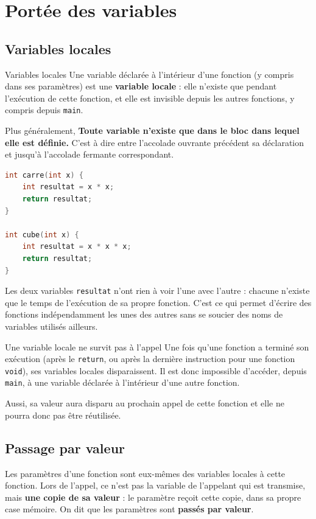 \section{Portée des variables}
\subsection{Variables locales}

\begin{UPSTIinfor}{Variables locales}
  Une variable déclarée à l'intérieur d'une fonction (y compris dans ses paramètres) est une \textbf{variable locale} : elle n'existe que pendant l'exécution de cette fonction, et elle est invisible depuis les autres fonctions, y compris depuis \texttt{main}.

  Plus généralement, \textbf{Toute variable n'existe que dans le bloc dans lequel elle est définie.} 
  C'est à dire entre l'accolade ouvrante précédent sa déclaration et jusqu'à l'accolade fermante correspondant. 
\end{UPSTIinfor}

\begin{lstlisting}[language=c,caption={Deux variables locales du même nom, sans conflit}]
int carre(int x) {
    int resultat = x * x;
    return resultat;
}

int cube(int x) {
    int resultat = x * x * x;
    return resultat;
}
\end{lstlisting}

Les deux variables \texttt{resultat} n'ont rien à voir l'une avec l'autre : chacune n'existe que le temps de l'exécution de sa propre fonction. C'est ce qui permet d'écrire des fonctions indépendamment les unes des autres sans se soucier des noms de variables utilisés ailleurs.

\begin{UPSTIwarning}{Une variable locale ne survit pas à l'appel}
  Une fois qu'une fonction a terminé son exécution (après le \texttt{return}, ou après la dernière instruction pour une fonction \texttt{void}), ses variables locales disparaissent. Il est donc impossible d'accéder, depuis \texttt{main}, à une variable déclarée à l'intérieur d'une autre fonction.

  Aussi, sa valeur aura disparu au prochain appel de cette fonction et elle ne pourra donc pas être réutilisée. 
\end{UPSTIwarning}
\subsection{Passage par valeur}
Les paramètres d'une fonction sont eux-mêmes des variables locales à cette fonction. Lors de l'appel, ce n'est pas la variable de l'appelant qui est transmise, mais \textbf{une copie de sa valeur} : le paramètre reçoit cette copie, dans sa propre case mémoire. On dit que les paramètres sont \textbf{passés par valeur}.

